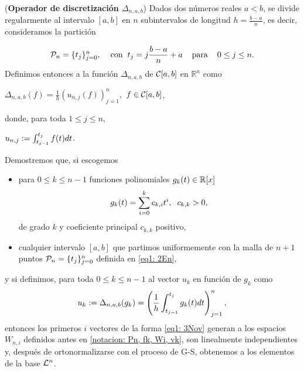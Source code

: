 \begin{defi}
(\textbf{Operador de discretización $\Delta_{n,a,b}$})
Dados dos números reales $a<b$, se divide
regularmente al intervalo $[a,b]$ en 
$n$ subintervalos de longitud $h=\frac{b-a}{n}$,
es decir, consideramos la partición


\begin{equation}
\label{eq1: 2En}
\mathcal{P}_{n}= \{ t_{j} \}_{j=0}^{n}, 
\hspace{0.4cm} \text{con} \hspace{0.2cm}
t_{j}=j\frac{b-a}{n}+a \hspace{0.4cm} \text{para}\hspace{0.4cm}
 0 \leq j \leq n.
\end{equation}
Definimos entonces a la función $\Delta_{n,a,b}$ 
de $\mathcal{C}[a,b]$ en $\mathbb{R}^{n}$ como
\begin{center}
$\Delta_{n,a,b}(f)= \frac{1}{h} (u_{n,j}(f))_{j=1}^{n},$ \hspace{0.3cm}
$f \in \mathcal{C}[a,b]$,
\end{center}
donde, para toda $1 \leq j \leq n$,
\begin{center}
$u_{n,j}:= \int_{t_{j-1}}^{t_{j}}{f(t)dt}$.
\end{center}
\end{defi}



\noindent
Demostremos que, si escogemos
\begin{itemize}
\item para $0 \leq k \leq n-1$ funciones polinomiales
$g_{k}(t) \in \mathbb{R}[x]$
\begin{equation}
\label{eq10: 3Nov}
g_{k}(t)= \sum\limits_{i=0}^{k}c_{k,i}t^{i},
\hspace{0.2cm} c_{k, k} >0,
\end{equation}
de grado $k$ y coeficiente principal 
$c_{k,k}$ positivo, 

\item cualquier intervalo $[a,b]$ que partimos 
uniformemente con la malla de $n+1$ puntos
$\mathcal{P}_{n}= \{ t_{j} \}_{j=0}^{n}$ 
definida en \eqref{eq1: 2En},

\end{itemize}

y si definimos, para toda $0\leq k \leq  n-1$
al vector $u_{k}$ en función de $g_{k}$ como 
\begin{equation}
\label{eq1: 3Nov}
u_{k}:= \Delta_{n,a,b}(g_{k})
= \left( \frac{1}{h} 
\int_{t_{j-1}}^{t_{j}}{g_{k}(t)dt} \right)_{j=1}^{n} , 
\end{equation}
entonces los primeros $i$ vectores
de la forma \eqref{eq1: 3Nov}
generan a los espacios $W_{n,i}$
definidos antes en 
\ref{notacion: Pn, fk, Wi, vk},
son linealmente independientes y,
después de ortonormalizarse con 
el proceso de G-S,
obtenemos a los elementos de la base $\mathcal{L}^{n}$.

